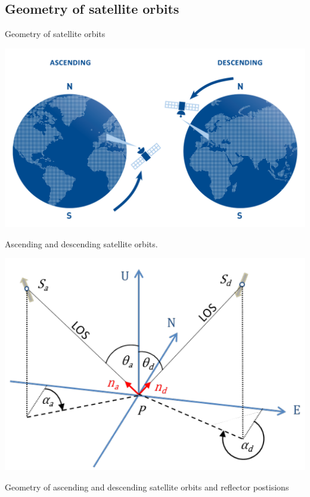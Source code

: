 \documentclass{beamer}
\begin{document}
\subsection{Geometry of satellite orbits}

\begin{frame}{Geometry of satellite orbits}
    \begin{minipage}[c]{0.45\textwidth}
        \centering
        \includegraphics[width=\textwidth]{ascending_descending_orbits.png}
        
        Ascending and descending satellite orbits.
    \end{minipage}
    \hspace{10pt}
    \begin{minipage}[c]{0.45\textwidth}
        \centering
        \includegraphics[width=\textwidth]{daisy_schematic.png}
        
        Geometry of ascending and descending satellite orbits and reflector postisions
    \end{minipage}
\end{frame}
\end{document}
